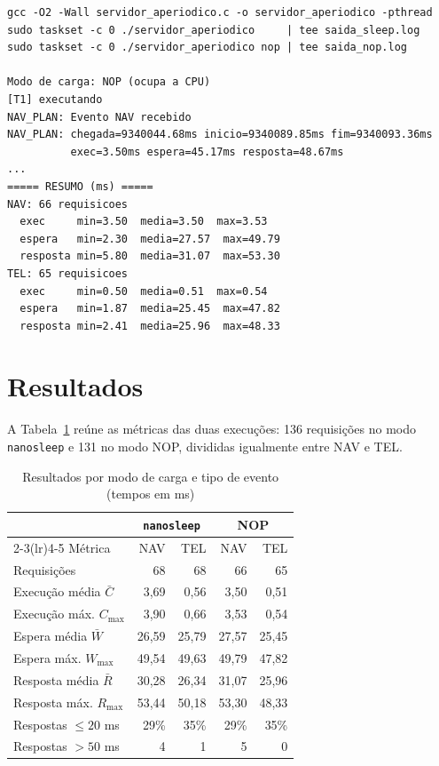 \documentclass[conference,a4paper]{IEEEtran}
\begin{document}
\begin{lstlisting}[basicstyle=\ttfamily\fontsize{6}{7}\selectfont,caption={Comandos de execução e trecho da saída do modo NOP, com o resumo impresso pelo programa.},label={lst:saida}]
gcc -O2 -Wall servidor_aperiodico.c -o servidor_aperiodico -pthread
sudo taskset -c 0 ./servidor_aperiodico     | tee saida_sleep.log
sudo taskset -c 0 ./servidor_aperiodico nop | tee saida_nop.log

Modo de carga: NOP (ocupa a CPU)
[T1] executando
NAV_PLAN: Evento NAV recebido
NAV_PLAN: chegada=9340044.68ms inicio=9340089.85ms fim=9340093.36ms
          exec=3.50ms espera=45.17ms resposta=48.67ms
...
===== RESUMO (ms) =====
NAV: 66 requisicoes
  exec     min=3.50  media=3.50  max=3.53
  espera   min=2.30  media=27.57  max=49.79
  resposta min=5.80  media=31.07  max=53.30
TEL: 65 requisicoes
  exec     min=0.50  media=0.51  max=0.54
  espera   min=1.87  media=25.45  max=47.82
  resposta min=2.41  media=25.96  max=48.33
\end{lstlisting}

\section{Resultados}

A Tabela~\ref{tab:result} reúne as métricas das duas execuções: 136 requisições no modo \texttt{nanosleep} e 131 no modo NOP, divididas igualmente entre NAV e TEL.

\begin{table}[!t]
\centering
\caption{Resultados por modo de carga e tipo de evento (tempos em ms)}
\label{tab:result}
\footnotesize
\setlength{\tabcolsep}{5pt}
\begin{tabular}{lrrrr}
\toprule
 & \multicolumn{2}{c}{\texttt{nanosleep}} & \multicolumn{2}{c}{NOP} \\
\cmidrule(lr){2-3}\cmidrule(lr){4-5}
Métrica & NAV & TEL & NAV & TEL \\
\midrule
Requisições            & 68    & 68    & 66    & 65    \\
\midrule
Execução média $\bar C$ & 3,69  & 0,56  & 3,50  & 0,51  \\
Execução máx. $C_{\max}$ & 3,90 & 0,66  & 3,53  & 0,54  \\
\midrule
Espera média $\bar W$   & 26,59 & 25,79 & 27,57 & 25,45 \\
Espera máx. $W_{\max}$  & 49,54 & 49,63 & 49,79 & 47,82 \\
\midrule
Resposta média $\bar R$ & 30,28 & 26,34 & 31,07 & 25,96 \\
Resposta máx. $R_{\max}$ & 53,44 & 50,18 & 53,30 & 48,33 \\
Respostas $\le 20$ ms  & 29\%  & 35\%  & 29\%  & 35\%  \\
Respostas $> 50$ ms    & 4     & 1     & 5     & 0     \\
\bottomrule
\end{tabular}
\end{table}
\end{document}
